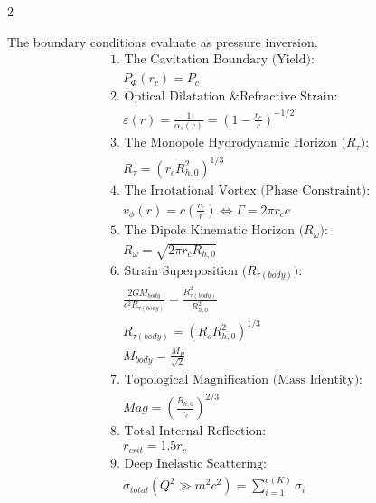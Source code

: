 \begin{multicols}{2}
\begin{tcolorbox}[cheatbox, title={\refstepcounter{cheatnum}\label{box:localized_metric_strain}\thecheatnum. The Localized Metric \hfill\scriptsize\hyperref[sec:deriv_localized_metric_strain]{[Proof $\downarrow$]}}]
The boundary conditions evaluate as pressure inversion.
\begin{align}   
    &\text{1. The Cavitation Boundary (Yield):} \nonumber \\
    &\quad P_\Phi(r_c) = P_c \label{eq:pressure_cavitation_boundary} \\
    &\text{2. Optical Dilatation \& Refractive Strain:} \nonumber \\
    &\quad \varepsilon(r) = \frac{1}{\alpha_s(r)} = \left( 1 - \frac{r_c}{r} \right)^{-1/2} \label{eq:strain_redshift_identity}  \\
    &\text{3. The Monopole Hydrodynamic Horizon ($R_\tau$):} \nonumber \\
    &\quad R_\tau = \left( r_c R_{h,0}^2 \right)^{1/3} \label{eq:hydrodynamic_horizon_equivalence} \\
    &\text{4. The Irrotational Vortex (Phase Constraint):} \nonumber \\
    &\quad v_\phi(r) = c \left( \frac{r_c}{r} \right) \iff \Gamma = 2\pi r_c c \label{eq:irrotational_velocity_field} \\
    &\text{5. The Dipole Kinematic Horizon ($R_\omega$):} \nonumber \\
    &\quad R_\omega = \sqrt{2\pi r_c R_{h,0}} \label{eq:dipole_horizon_equivalence} \\
    &\text{6. Strain Superposition ($R_{\tau(body)}$):} \nonumber \\
    &\quad \frac{2 G M_{body}}{c^2 R_{\tau(body)}} = \frac{R_{\tau(body)}^2}{R_{h,0}^2} \label{eq:macroscopic_equilibration} \\
    &\quad R_{\tau(body)} = \left( R_s R_{h,0}^2 \right)^{1/3} \label{eq:body_halo_scaling} \\
    &\quad M_{body} = \frac{M_P}{\sqrt{2}} \label{eq:planck_intersection} \\
    &\text{7. Topological Magnification (Mass Identity):} \nonumber \\
    &\quad Mag = \left( \frac{R_{h,0}}{r_c} \right)^{2/3} \label{eq:conformal_mag_substituted} \\
    &\text{8. Total Internal Reflection:} \nonumber \\
    &\quad r_{crit} = 1.5 r_c \label{eq:critical_optical_radius} \\
    &\text{9. Deep Inelastic Scattering:} \nonumber \\
    &\quad \sigma_{total}(Q^2 \gg m^2 c^2) = \sum_{i=1}^{c(K)} \sigma_i \label{eq:deep_inelastic} 
\end{align}
\end{tcolorbox}





\end{multicols}
